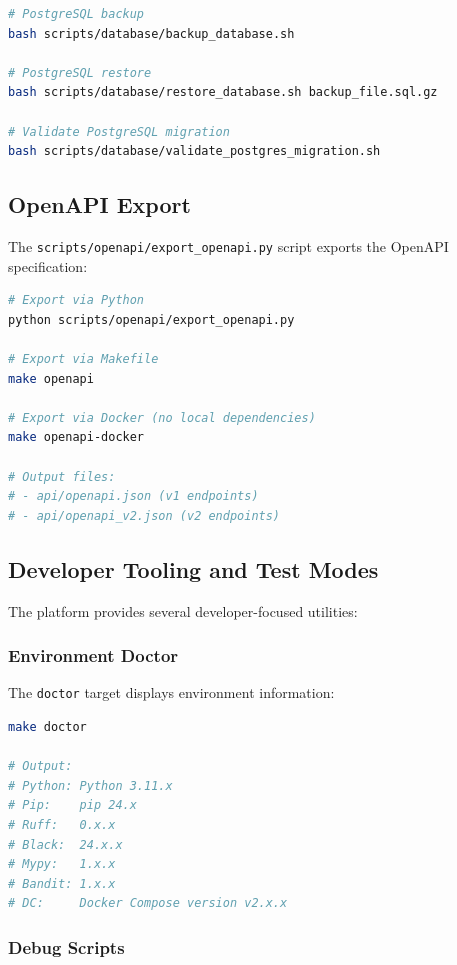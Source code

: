 \begin{lstlisting}[language=bash, caption=Database backup scripts]
# PostgreSQL backup
bash scripts/database/backup_database.sh

# PostgreSQL restore
bash scripts/database/restore_database.sh backup_file.sql.gz

# Validate PostgreSQL migration
bash scripts/database/validate_postgres_migration.sh
\end{lstlisting}

\subsection{OpenAPI Export}

The \texttt{scripts/openapi/export\_openapi.py} script exports the OpenAPI specification:

\begin{lstlisting}[language=bash, caption=OpenAPI export]
# Export via Python
python scripts/openapi/export_openapi.py

# Export via Makefile
make openapi

# Export via Docker (no local dependencies)
make openapi-docker

# Output files:
# - api/openapi.json (v1 endpoints)
# - api/openapi_v2.json (v2 endpoints)
\end{lstlisting}

\subsection{Developer Tooling and Test Modes}
\label{subsec:developer-tooling}

The platform provides several developer-focused utilities:

\subsubsection{Environment Doctor}

The \texttt{doctor} target displays environment information:

\begin{lstlisting}[language=bash, caption=Environment doctor target]
make doctor

# Output:
# Python: Python 3.11.x
# Pip:    pip 24.x
# Ruff:   0.x.x
# Black:  24.x.x
# Mypy:   1.x.x
# Bandit: 1.x.x
# DC:     Docker Compose version v2.x.x
\end{lstlisting}

\subsubsection{Debug Scripts}

